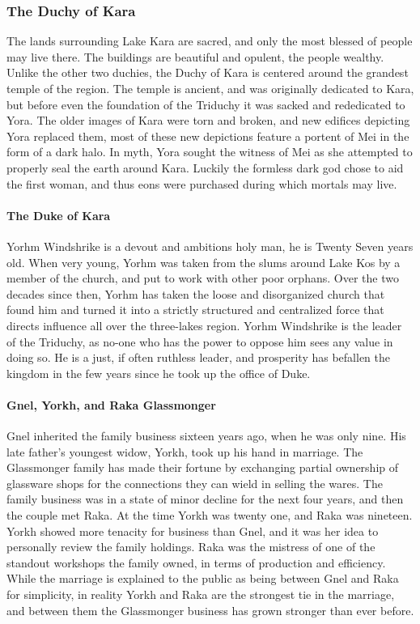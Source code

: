 \subsubsection{The Duchy of Kara}
The lands surrounding Lake Kara are sacred, and only the most blessed of people may live there. The buildings are beautiful and opulent, the people wealthy. Unlike the other two duchies, the Duchy of Kara is centered around the grandest temple of the region. The temple is ancient, and was originally dedicated to Kara, but before even the foundation of the Triduchy it was sacked and rededicated to Yora. The older images of Kara were torn and broken, and new edifices depicting Yora replaced them, most of these new depictions feature a portent of Mei in the form of a dark halo. In myth, Yora sought the witness of Mei as she attempted to properly seal the earth around Kara. Luckily the formless dark god chose to aid the first woman, and thus eons were purchased during which mortals may live.

\paragraph{The Duke of Kara}
Yorhm Windshrike is a devout and ambitions holy man, he is Twenty Seven years old. When very young, Yorhm was taken from the slums around Lake Kos by a member of the church, and put to work with other poor orphans. Over the two decades since then, Yorhm has taken the loose and disorganized church that found him and turned it into a strictly structured and centralized force that directs influence all over the three-lakes region. Yorhm Windshrike is the leader of the Triduchy, as no-one who has the power to oppose him sees any value in doing so. He is a just, if often ruthless leader, and prosperity has befallen the kingdom in the few years since he took up the office of Duke.

\paragraph{Gnel, Yorkh, and Raka Glassmonger}
Gnel inherited the family business sixteen years ago, when he was only nine. His late father’s youngest widow, Yorkh, took up his hand in marriage. The Glassmonger family has made their fortune by exchanging partial ownership of glassware shops for the connections they can wield in selling the wares. The family business was in a state of minor decline for the next four years, and then the couple met Raka. At the time Yorkh was twenty one, and Raka was nineteen. Yorkh showed more tenacity for business than Gnel, and it was her idea to personally review the family holdings. Raka was the mistress of one of the standout workshops the family owned, in terms of production and efficiency. While the marriage is explained to the public as being between Gnel and Raka for simplicity, in reality Yorkh and Raka are the strongest tie in the marriage, and between them the Glassmonger business has grown stronger than ever before.

